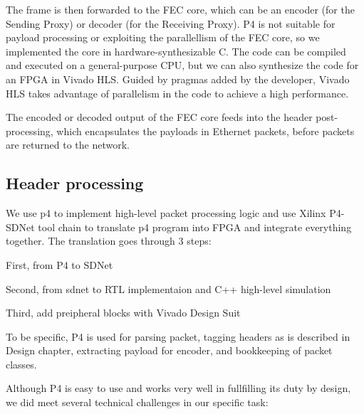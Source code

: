 The frame is then forwarded to the FEC core, which can be an encoder (for the Sending Proxy) or decoder (for the
Receiving Proxy).
P4 is not suitable
for
payload processing or
exploiting the parallellism of the FEC core, so we implemented the core in
hardware-synthesizable C. The code can be compiled and executed on a
general-purpose CPU, but we can also synthesize the code for an FPGA
in Vivado HLS.  Guided by pragmas added by the developer, Vivado HLS takes
advantage of parallelism in the code to achieve a high performance.

The encoded or decoded output of the FEC core feeds into the header
post-processing, which encapsulates the payloads in Ethernet packets, before packets are returned to the network.

\subsection{Header processing}
\label{sec:impl:header-processing}
We use p4 to implement high-level packet processing logic and 
use Xilinx P4-SDNet tool chain to translate p4 program into FPGA and integrate everything together.
The translation goes through 3 steps:

First, from P4 to SDNet

Second, from sdnet to RTL implementaion and C++ high-level simulation

Third, add preipheral blocks with Vivado Design Suit

To be specific, P4 is used for parsing packet, tagging headers as is described in Design chapter,
extracting payload for encoder, and bookkeeping of packet classes.

Although P4 is easy to use and works very well in fullfilling its duty by design,
we did meet several technical challenges in our specific task:

